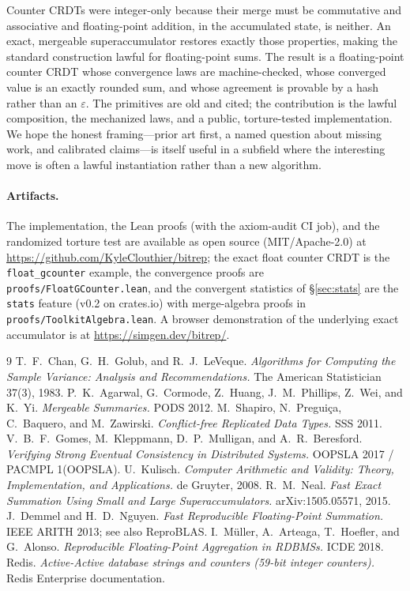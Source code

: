 \documentclass[11pt]{article}
\begin{document}
Counter CRDTs were integer-only because their merge must be commutative and associative and floating-point
addition, in the accumulated state, is neither. An exact, mergeable superaccumulator restores exactly
those properties, making the standard construction lawful for floating-point sums. The result is a
floating-point counter CRDT whose convergence laws are machine-checked, whose converged value is an
exactly rounded sum, and whose agreement is provable by a hash rather than an $\varepsilon$. The
primitives are old and cited; the contribution is the lawful composition, the mechanized laws, and a
public, torture-tested implementation. We hope the honest framing---prior art first, a named question
about missing work, and calibrated claims---is itself useful in a subfield where the interesting move
is often a lawful instantiation rather than a new algorithm.

\paragraph{Artifacts.} The implementation, the Lean proofs (with the axiom-audit CI job), and the
randomized torture test are available as open source (MIT/Apache-2.0) at
\url{https://github.com/KyleClouthier/bitrep}; the exact float counter CRDT is the
\texttt{float\_gcounter} example, the convergence proofs are \texttt{proofs/FloatGCounter.lean}, and
the convergent statistics of \S\ref{sec:stats} are the \texttt{stats} feature (v0.2 on crates.io) with
merge-algebra proofs in \texttt{proofs/ToolkitAlgebra.lean}. A browser demonstration of the underlying
exact accumulator is at \url{https://simgen.dev/bitrep/}.

\begin{thebibliography}{9}
 T.~F.~Chan, G.~H.~Golub, and R.~J.~LeVeque.
  \emph{Algorithms for Computing the Sample Variance: Analysis and Recommendations.}
  The American Statistician 37(3), 1983.
 P.~K.~Agarwal, G.~Cormode, Z.~Huang, J.~M.~Phillips, Z.~Wei, and K.~Yi.
  \emph{Mergeable Summaries.} PODS 2012.
 M.~Shapiro, N.~Pregui\c{c}a, C.~Baquero, and M.~Zawirski.
  \emph{Conflict-free Replicated Data Types.} SSS 2011.
 V.~B.~F.~Gomes, M.~Kleppmann, D.~P.~Mulligan, and A.~R.~Beresford.
  \emph{Verifying Strong Eventual Consistency in Distributed Systems.} OOPSLA 2017 / PACMPL 1(OOPSLA).
 U.~Kulisch. \emph{Computer Arithmetic and Validity: Theory, Implementation, and
  Applications.} de Gruyter, 2008.
 R.~M.~Neal. \emph{Fast Exact Summation Using Small and Large Superaccumulators.}
  arXiv:1505.05571, 2015.
 J.~Demmel and H.~D.~Nguyen. \emph{Fast Reproducible Floating-Point Summation.}
  IEEE ARITH 2013; see also ReproBLAS.
 I.~M\"uller, A.~Arteaga, T.~Hoefler, and G.~Alonso.
  \emph{Reproducible Floating-Point Aggregation in RDBMSs.} ICDE 2018.
 Redis. \emph{Active-Active database strings and counters (59-bit integer counters).}
  Redis Enterprise documentation.
\end{thebibliography}
\end{document}
